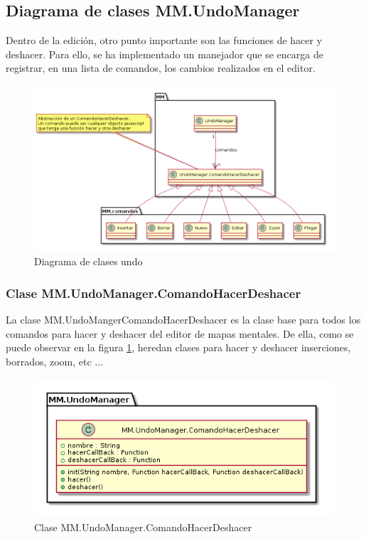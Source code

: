 \subsection{Diagrama de clases MM.UndoManager}

Dentro de la edición, otro punto importante son las funciones de hacer y deshacer. Para ello, se ha implementado un manejador que se encarga de registrar, en una lista de comandos, los cambios 
realizados en el editor.

\begin{figure}[tbph]
\centering
\includegraphics[width=\linewidth]{imagenes/diagrama-clases-mm-undo}
\caption{Diagrama de clases undo}
\label{fig:diagrama-clases-mm-undo}
\end{figure}

\subsubsection{Clase MM.UndoManager.ComandoHacerDeshacer}

La clase MM.UndoMangerComandoHacerDeshacer es la clase base para todos los comandos para hacer y
deshacer del editor de mapas mentales. De ella, como se puede observar en la figura \ref{fig:diagrama-clases-mm-undo}, heredan clases para hacer y deshacer inserciones, borrados, 
zoom, etc ...  

\begin{figure}[tbph]
\centering
\includegraphics[width=0.7\linewidth]{imagenes/diagrama-clase-mm-undomanager-comandohacerdeshacer}
\caption{Clase MM.UndoManager.ComandoHacerDeshacer}
\label{fig:diagrama-clase-mm-undomanager-comandohacerdeshacer}
\end{figure}

